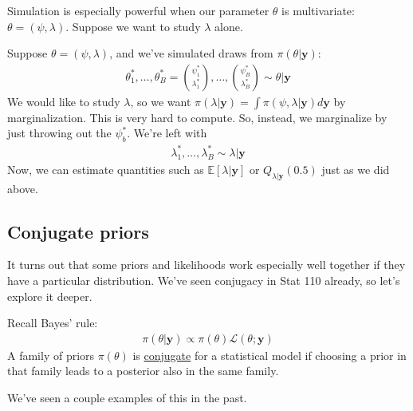 \documentclass[12pt]{article}
\newcommand{\E}{\mathbb{E}}
\begin{document}
\medskip

\noindent Simulation is especially powerful when our parameter $\theta$ is multivariate: $\theta = (\psi, \lambda)$. Suppose we want to study $\lambda$ alone.

\begin{tcolorbox}[breakable, title= \textbf{Example}: Bayesian simulation using marginalization]
    Suppose $\theta = (\psi,\lambda)$, and we've simulated draws from $\pi(\theta|\textbf{y})$:
    \begin{align*}
        \theta_1^*,\dots,\theta_B^* = \binom{\psi_1^*}{\lambda_1^*} ,\dots,\binom{\psi_B^*}{\lambda_B^*} \sim \theta|\textbf{y}
    \end{align*}
    We would like to study $\lambda$, so we want $\pi(\lambda|\textbf{y}) = \int\pi(\psi,\lambda|\textbf{y})d\textbf{y}$ by marginalization. This is very hard to compute. So, instead, we marginalize by just throwing out the $\psi_b^*$. We're left with
    \begin{align*}
        \lambda_1^*,\dots,\lambda_B^* \sim \lambda|\textbf{y}
    \end{align*}
    Now, we can estimate quantities such as $\E[\lambda|\textbf{y}]$ or $Q_{\lambda|\textbf{y}}(0.5)$ just as we did above.
\end{tcolorbox}

\subsection{Conjugate priors}

\noindent It turns out that some priors and likelihoods work especially well together if they have a particular distribution. We've seen conjugacy in Stat 110 already, so let's explore it deeper.

\medskip

\begin{tcolorbox}[breakable, title = \textbf{Definition}: Conjugate prior]
    Recall Bayes' rule:
    \begin{align*}
        \pi(\theta|\textbf{y}) \propto \pi(\theta)\mathcal{L}(\theta;\textbf{y})
    \end{align*}
    A family of priors $\pi(\theta)$ is \underline{conjugate} for a statistical model if choosing a prior in that family leads to a posterior also in the same family.
\end{tcolorbox}

\medskip

\noindent We've seen a couple examples of this in the past.
\end{document}
